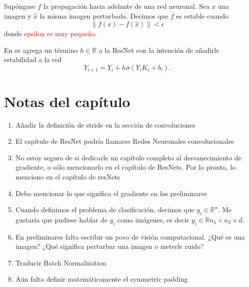 \begin{definition}
    Supóngase $f$ la propagación hacia adelante de una red neuronal. Sea $x$ una imagen y $\hat x$ la misma imagen perturbada. Decimos que $f$ es estable cuando 
    \begin{equation}
        \|f(x)-f(\hat x)\| < \epsilon
    \end{equation}
    donde \textcolor{red}{epsilon es muy pequeño}
\end{definition}
En \cite{stable_resnets} se agrega un término $h\in \mathbb R$ a la ResNet con la intención de añadirle estabilidad a la red
\begin{equation}
    Y_{i+1} = Y_i + h\sigma(Y_iK_i + b_i).
\end{equation}
 \section{Notas del capítulo}
 \begin{enumerate}
     \item Añadir la definición de stride en la sección de convoluciones
     \item El capítulo de ResNet podría llamarse Redes Neuronales convolucionales
     \item No estoy seguro de si dedicarle un capítulo completo al desvanecimiento de gradiente, o sólo mencionarlo en el capítulo de ResNets. Por lo pronto, lo menciono en el capítulo  de resNets
     \item Debo mencionar lo que significa el gradiente en los preliminares
     \item Cuando definimos el problema de clasificación, decimos que $y_i\in \mathbb R^n$. Me gustaría que pudiese hablar de $y_i$ como imágenes, es decir $y_i\in \mathbb R{n_1\times n_2 \times d}$. 
     \item En preliminares falta escribir un poco de visión computacional. ¿Qué es una imagen? ¿Qué significa perturbar una imagen o meterle ruido?
     \item Traducir Batch Normalization
     \item Aún falta definir matemáticamente el symmetric padding
 \end{enumerate}


 